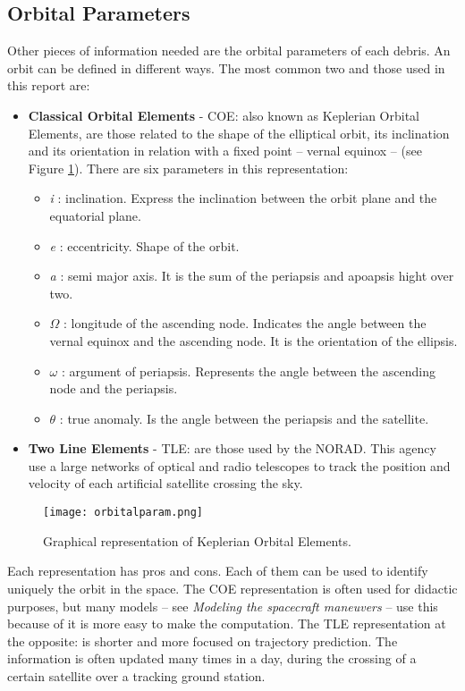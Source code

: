 \documentclass[a4paper,9pt,journal,twoside,compsoc]{PPIEEEtran}
\begin{document}
\subsection{Orbital Parameters}
Other pieces of information needed are the orbital parameters of each debris. An orbit can be defined in different ways. The most common two and those used in this report are:

\begin{itemize}
\item \textbf{Classical Orbital Elements} - COE: also known as Keplerian Orbital Elements, are those related to the shape of the elliptical orbit, its inclination and its orientation in relation with a fixed point -- vernal equinox -- (see Figure \ref{fig:orbitalparam}). There are six parameters in this representation:
\begin{itemize}
\item \textit{i} : inclination. Express the inclination between the orbit plane and the equatorial plane.
\item \textit{e} : eccentricity. Shape of the orbit.
\item \textit{a} : semi major axis. It is the sum of the periapsis and apoapsis hight over two.
\item \textit{$\Omega$} : longitude of the ascending node. Indicates the angle between the vernal equinox and the ascending node. It is the orientation of the ellipsis.
\item \textit{$\omega$} : argument of periapsis. Represents the angle between the ascending node and the periapsis.
\item \textit{ $\theta$ } : true anomaly. Is the angle between the periapsis and the satellite.

\end{itemize}
\item \textbf{Two Line Elements} - TLE: are those used by the NORAD. This agency use a large networks of optical and radio telescopes to track the position and velocity of each artificial satellite crossing the sky.
\end{itemize}

\begin{figure}[h]
\centering	
\texttt{[image: orbitalparam.png]}
\caption{Graphical representation of Keplerian Orbital Elements.}
\label{fig:orbitalparam}
\end{figure}


Each representation has pros and cons. Each of them can be used to identify uniquely the orbit in the space. The COE representation is often used for didactic purposes, but many models -- see \textit{Modeling the spacecraft maneuvers} -- use this because of it is more easy to make the computation. The TLE representation at the opposite: is shorter and more focused on trajectory prediction. The information is often updated many times in a day, during the crossing of a certain satellite over a tracking ground station.
\end{document}
